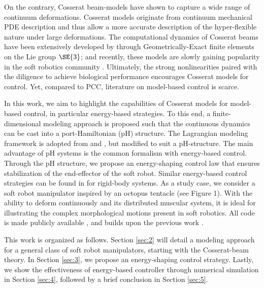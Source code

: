 On the contrary, Cosserat beam-models have shown to capture a wide range of continuum deformations. Cosserat models originate from continuum mechanical PDE description and thus allow a more accurate description of the hyper-flexible nature under large deformations. The computational dynamics of Cosserat beams have been extensively developed by \cite{Simo1986} through Geometrically-Exact finite elements on the Lie group $\SE{3}$; and recently, these models are slowly gaining popularity in the soft robotics community \cite{Renda2018,Renda2020,Boyer2021,Till2019}. Ultimately, the strong nonlinearities paired with the diligence to achieve biological performance encourages Cosserat models for control. Yet, compared to PCC, literature on model-based control is scarce.

In this work, we aim to highlight the capabilities of Cosserat models for model-based control, in particular energy-based strategies. To this end, a finite-dimensional modeling approach is proposed such that the continuous dynamics can be cast into a port-Hamiltonian (pH) structure. The Lagrangian modeling framework is adopted from \cite{Boyer2021} and \cite{Renda2020}, but modified to suit a pH-structure. The main advantage of pH systems is the common formalism with energy-based control. Through the pH structure, we propose an energy-shaping control law that ensures stabilization of the end-effector of the soft robot. Similar energy-based control strategies can be found in \cite{Franco2020,Schaft2004,Ortega2002,Ortega1998} for rigid-body systems. As a study case, we consider a soft robot manipulator inspired by an octopus tentacle (see Figure 1). With the ability to deform continuously and its distributed muscular system, it is ideal for illustrating the complex morphological motions present in soft robotics. All code is made publicly available \cite{Caasenbrood2020}, and builds upon the previous work \cite{Caasenbrood2021}.

This work is organized as follows. Section \ref{sec:2} will detail a modeling approach for a general class of soft robot manipulators, starting with the Cosserat-beam theory. In Section \ref{sec:3}, we propose an energy-shaping control strategy. Lastly, we show the effectiveness of energy-based controller through numerical simulation in Section  \ref{sec:4}, followed by a brief conclusion in Section  \ref{sec:5}.
